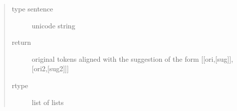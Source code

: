 \documentclass[letterpaper,10pt,english]{sphinxmanual}
\begin{document}
\begin{fulllineitems}
\begin{fulllineitems}
\begin{description}
\begin{quote}
\begin{description}
\item[{type sentence}] \leavevmode
unicode string

\item[{return}] \leavevmode
original tokens aligned with the suggestion of the form {[}{[}ori,{[}sug{]}{]},{[}ori2,{[}sug2{]}{]}{]}

\item[{rtype}] \leavevmode
list of lists

\end{description}\end{quote}

\end{description}

\end{fulllineitems}


\end{fulllineitems}

\label{API:module-norm.modules.wordsplit}
\end{document}
